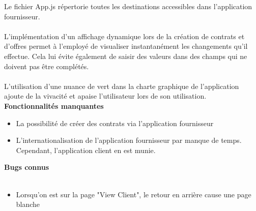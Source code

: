 \documentclass[../rapport.tex]{subfiles}
\begin{document}
Le fichier App.js répertorie toutes les destinations accessibles dans l'application fournisseur.\\ \\
L'implémentation d'un affichage dynamique lors de la création de contrats et d'offres permet à l'employé de visualiser instantanément les changements qu'il effectue. Cela lui évite également de saisir des valeurs dans des champs qui ne doivent pas être complétés.\\ \\
L'utilisation d'une nuance de vert dans la charte graphique de l'application ajoute de la vivacité et apaise l'utilisateur lors de son utilisation.
\textbf{Fonctionnalités manquantes} \\
\begin{itemize}
    \item La possibilité de créer des contrats via l'application fournisseur
    \item L'internationalisation de l'application fournisseur par manque de temps. Cependant, l'application client en est munie.
\end{itemize}
\textbf{Bugs connus}\\ \\
\begin{itemize}
    \item Lorsqu'on est sur la page "View Client", le retour en arrière cause une page blanche
\end{itemize}
\end{document}
